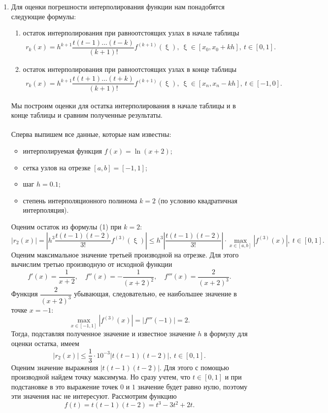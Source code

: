 \documentclass[a4paper, 12pt]{article}
\renewcommand{\leq}{\leqslant}
\renewcommand{\xi}{\upxi}
\begin{document}
\begin{enumerate}
	\newpage
	\item 
	\hypertarget{t4}{}
	Для оценки погрешности интерполирования функции нам понадобятся следующие формулы:
	\begin{enumerate}
		\item остаток интерполирования при равноотстоящих узлах в начале таблицы \begin{eqnarray}
			r_k(x) =h^{k+1} \dfrac{t(t-1)\ldots (t-k)}{(k+1)!}f^{(k+1)}(\xi),\ \xi \in [x_0, x_0 + kh],\ t\in [0,1].
		\end{eqnarray}
		\item остаток интерполирования при равноотстоящих узлах в конце таблицы
		\begin{eqnarray}
			r_k(x) = h^{k+1}\dfrac{t(t+1)\ldots (t+k)}{(k+1)!}f^{(k+1)}(\xi),\ \xi \in [x_n, x_{n}-kh],\ t\in [-1,0].
		\end{eqnarray}
	\end{enumerate}
	Мы построим оценки для остатка интерполирования в начале таблицы и в конце таблицы и сравним полученные результаты.\\\\
	Сперва выпишем все данные, которые нам известны:\begin{itemize}
		\item интерполируемая функция $f(x) = \ln(x+2)$;
		\item сетка узлов на отрезке $[a,b] = [-1, 1]$;
		\item шаг $h = 0.1$;
		\item степень интерполяционного полинома $k=2$ (по условию квадратичная интерполяция).
	\end{itemize}
	Оценим остаток из формулы (1) при $k=2$:
	$$|r_2(x)| =\left|h^{3} \dfrac{t(t-1)(t-2)}{3!}f^{(3)}(\xi)\right|\leq h^{3}\left|\dfrac{t(t-1)(t-2)}{3!}\right|\cdot \underset{x\in[a,b]}{\max}|f^{(3)}(x)|,\ t\in [0,1].$$
	Оценим максимальное значение третьей производной на отрезке. Для этого вычислим третью производную от исходной функции $$f'(x) = \dfrac{1}{x+2},\quad f''(x) = -\dfrac{1}{(x+2)^2},\quad f'''(x) = \dfrac{2}{(x+2)^3}.$$
	Функция $\dfrac{2}{(x+2)^3}$ убывающая, следовательно, ее наибольшее значение в точке $x=-1$: $$\underset{x\in[-1,1]}{\max}|f^{(3)}(x)|= |f'''(-1)|= 2.$$
	Тогда, подставляя полученное значение и известное значение $h$ в формулу для оценки остатка, имеем $$|r_2(x)| \leq \dfrac{1}{3}\cdot10^{-3}\left|t(t-1)(t-2)\right|,\ t\in [0,1].$$
	Оценим значение выражения $\left|t(t-1)(t-2)\right|$. Для этого с помощью производной найдем точку максимума. Но сразу учтем, что $t\in [0,1]$ и при подстановке в это выражение точек $0$ и $1$ значение будет равно нулю, поэтому эти значения нас не интересуют. Рассмотрим функцию $$f(t) = t(t-1)(t-2) = t^3 - 3t^2 + 2t.$$

\end{enumerate}
\end{document}
